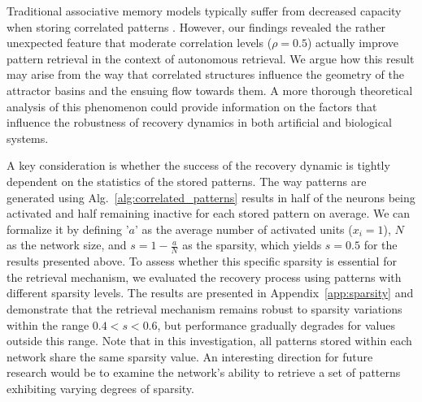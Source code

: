 \documentclass[10pt,letterpaper]{article}
\begin{document}

Traditional associative memory models typically suffer from decreased capacity when storing correlated patterns \cite{amit_spin-glass_1985}. However, our findings revealed the rather unexpected feature that moderate correlation levels ($\rho=0.5$) actually improve pattern retrieval in the context of autonomous retrieval. We argue how this result may arise from the way that correlated structures influence the geometry of the attractor basins and the ensuing flow towards them. A more thorough theoretical analysis of this phenomenon could provide information on the factors that influence the robustness of recovery dynamics in both artificial and biological systems.

A key consideration is whether the success of the recovery dynamic is tightly dependent on the statistics of the stored patterns. The way patterns are generated using Alg.~\ref{alg:correlated_patterns} results in half of the neurons being activated and half remaining inactive for each stored pattern on average.
We can formalize it by defining '$a$' as the average number of activated units ($x_i=1$), $N$ as the network size, and $s = 1-\frac{a}{N}$ as the sparsity, which yields $s = 0.5$ for the results presented above.
To assess whether this specific sparsity is essential for the retrieval mechanism, we evaluated the recovery process using patterns with different sparsity levels.
The results are presented in Appendix~\ref{app:sparsity} and demonstrate that the retrieval mechanism remains robust to sparsity variations within the range $0.4<s<0.6$, but performance gradually degrades for values outside this range. Note that in this investigation, all patterns stored within each network share the same sparsity value. An interesting direction for future research would be to examine the network’s ability to retrieve a set of patterns exhibiting varying degrees of sparsity.
\end{document}

